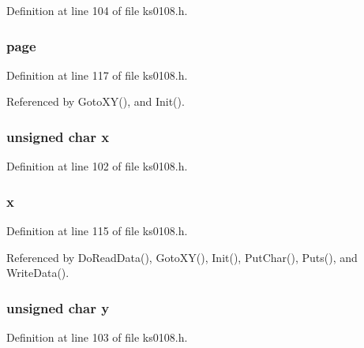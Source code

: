 Definition at line 104 of file ks0108.\-h.

\hypertarget{structlcd_coord_aadf5933189a2ff92dae7ee979000ff43}{
\subsubsection[{page}]{ page}}\label{structlcd_coord_aadf5933189a2ff92dae7ee979000ff43}


Definition at line 117 of file ks0108.\-h.



Referenced by Goto\-X\-Y(), and Init().

\hypertarget{structlcd_coord_ac1d1eed6a8bbca26af335b9682a6475e}{
\subsubsection[{x}]{\setlength{\rightskip}{0pt plus 5cm}unsigned char x}}\label{structlcd_coord_ac1d1eed6a8bbca26af335b9682a6475e}


Definition at line 102 of file ks0108.\-h.

\hypertarget{structlcd_coord_a66ab7498cbcfba822aa9a2891beffae2}{
\subsubsection[{x}]{ x}}\label{structlcd_coord_a66ab7498cbcfba822aa9a2891beffae2}


Definition at line 115 of file ks0108.\-h.



Referenced by Do\-Read\-Data(), Goto\-X\-Y(), Init(), Put\-Char(), Puts(), and Write\-Data().

\hypertarget{structlcd_coord_ac553850cf16d4c4f5812f7411e2b2b5a}{
\subsubsection[{y}]{\setlength{\rightskip}{0pt plus 5cm}unsigned char y}}\label{structlcd_coord_ac553850cf16d4c4f5812f7411e2b2b5a}


Definition at line 103 of file ks0108.\-h.

